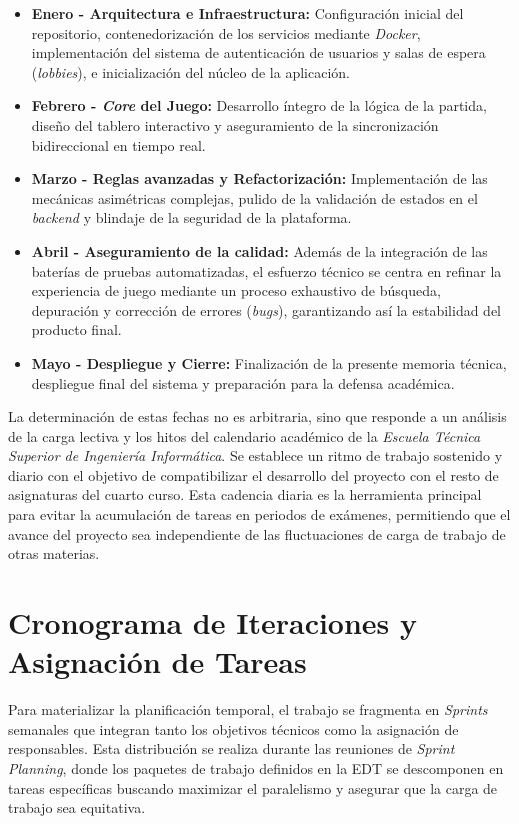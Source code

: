 \begin{itemize}
    \item \textbf{Enero - Arquitectura e Infraestructura:} Configuración inicial del repositorio, contenedorización de los servicios mediante \textit{Docker}, implementación del sistema de autenticación de usuarios y salas de espera (\textit{lobbies}), e inicialización del núcleo de la aplicación.
    \item \textbf{Febrero - \textit{Core} del Juego:} Desarrollo íntegro de la lógica de la partida, diseño del tablero interactivo y aseguramiento de la sincronización bidireccional en tiempo real.
    \item \textbf{Marzo - Reglas avanzadas y Refactorización:} Implementación de las mecánicas asimétricas complejas, pulido de la validación de estados en el \textit{backend} y blindaje de la seguridad de la plataforma.
    \item \textbf{Abril - Aseguramiento de la calidad:} Además de la integración de las baterías de pruebas automatizadas, el esfuerzo técnico se centra en refinar la experiencia de juego mediante un proceso exhaustivo de búsqueda, depuración y corrección de errores (\textit{bugs}), garantizando así la estabilidad del producto final.
    \item \textbf{Mayo - Despliegue y Cierre:} Finalización de la presente memoria técnica, despliegue final del sistema y preparación para la defensa académica.
\end{itemize}

La determinación de estas fechas no es arbitraria, sino que responde a un análisis de la carga lectiva y los hitos del calendario académico de la \textit{Escuela Técnica Superior de Ingeniería Informática}. Se establece un ritmo de trabajo sostenido y diario con el objetivo de compatibilizar el desarrollo del proyecto con el resto de asignaturas del cuarto curso. Esta cadencia diaria es la herramienta principal para evitar la acumulación de tareas en periodos de exámenes, permitiendo que el avance del proyecto sea independiente de las fluctuaciones de carga de trabajo de otras materias.

\section{Cronograma de Iteraciones y Asignación de Tareas}

Para materializar la planificación temporal, el trabajo se fragmenta en \textit{Sprints} semanales que integran tanto los objetivos técnicos como la asignación de responsables. Esta distribución se realiza durante las reuniones de \textit{Sprint Planning}, donde los paquetes de trabajo definidos en la EDT se descomponen en tareas específicas buscando maximizar el paralelismo y asegurar que la carga de trabajo sea equitativa.

